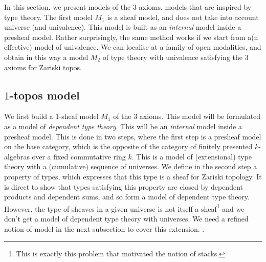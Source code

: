 \newcommand{\inc}{\mathsf{inc}}
\newcommand{\inl}{\mathsf{inl}}
\newcommand{\inr}{\mathsf{inr}}
\newcommand{\II}{\mathbf{I}}
\newcommand\norm[1]{\left\lVert #1 \right\rVert}


\newcommand{\Gm}{\mathsf{G_m}}
\newcommand{\ext}{\mathsf{ext}}
\newcommand{\patch}{\mathsf{patch}}
\newcommand{\cov}{\mathsf{cov}}
\newcommand{\isSheaf}{\mathsf{isSheaf}}
\newcommand{\Fib}{\mathsf{Fib}}

\newcommand{\BB}{\mathcal{B}}
\newcommand{\CC}{\mathcal{C}}
\newcommand{\UU}{\mathcal{U}}

In this section, we present models of the 3 axioms, models that are inspired by type theory.
The first model $M_1$ 
is a sheaf model, and does not
take into account universe (and univalence). This model is built
as an {\em internal} model inside a presheaf model. Rather surprisingly, the same method
works if we start from a(n effective) model of univalence. We can localise at a family of open modalities, and  obtain
in this way a model $M_2$ of type theory with univalence satisfying the
3 axioms for Zariski topos.

\subsection{$1$-topos model}

We first build a $1$-sheaf model $M_1$ of the 3 axioms. This model will be formulated as a model of {\em dependent type theory}.
This will be an {\em internal} model inside a presheaf model. This is done in two steps, where the first step is a presheaf model
on the base category, which is the opposite of the category of finitely presented $k$-algebras over a fixed commutative ring $k$.
This is a model of (extensional) type theory with a (cumulative) sequence of universes. We define in the second step a property
of types, which expresses that this type is a sheaf for Zariski topology. It is direct to show that types satisfying this property are
closed by dependent products and dependent sums, and so form a model of dependent type theory.
However, the type of sheaves in a given universe is not itself a sheaf\footnote{This is exactly this problem that motivated the notion
of stacks.} and we don't get a model of dependent type theory with universes. We need a refined notion of model in the next subsection
to cover this extension.
.


